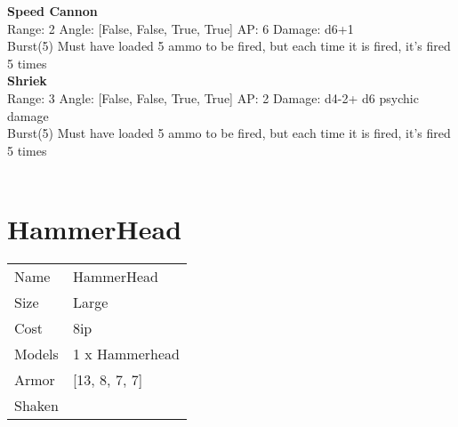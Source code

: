 {\bf Speed Cannon } \\



Range: 2  Angle: [False, False, True, True] AP: 6 Damage: d6+1 \\
Burst(5) Must have loaded 5 ammo to be fired, but each time it is fired, it's fired 5 times\\ 




{\bf Shriek } \\



Range: 3  Angle: [False, False, True, True] AP: 2 Damage: d4-2+ d6 psychic damage \\
Burst(5) Must have loaded 5 ammo to be fired, but each time it is fired, it's fired 5 times\\ 




 
\ \\













\clearpage

\section{ HammerHead }

\begin{tabular}{ll}
  Name & HammerHead \\
  Size & Large\\
  Cost & 8ip\\
  Models & 1 x Hammerhead\\
  Armor & [13, 8, 7, 7]\\
  Shaken & \\
\end{tabular}

\noindent 

